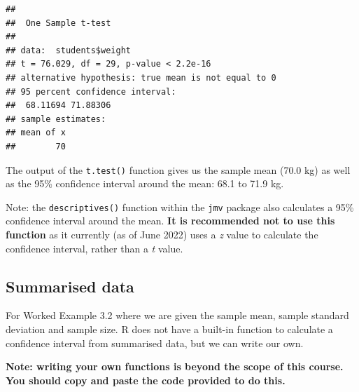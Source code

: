 \documentclass[
]{memoir}
\begin{document}
\begin{verbatim}
## 
##  One Sample t-test
## 
## data:  students$weight
## t = 76.029, df = 29, p-value < 2.2e-16
## alternative hypothesis: true mean is not equal to 0
## 95 percent confidence interval:
##  68.11694 71.88306
## sample estimates:
## mean of x 
##        70
\end{verbatim}

The output of the \texttt{t.test()} function gives us the sample mean (70.0 kg) as well as the 95\% confidence interval around the mean: 68.1 to 71.9 kg.

Note: the \texttt{descriptives()} function within the \texttt{jmv} package also calculates a 95\% confidence interval around the mean. \textbf{It is recommended not to use this function} as it currently (as of June 2022) uses a \emph{z} value to calculate the confidence interval, rather than a \emph{t} value.

\hypertarget{summarised-data}{%
\subsection{Summarised data}\label{summarised-data}}

For Worked Example 3.2 where we are given the sample mean, sample standard deviation and sample size. R does not have a built-in function to calculate a confidence interval from summarised data, but we can write our own.

\textbf{Note: writing your own functions is beyond the scope of this course. You should copy and paste the code provided to do this.}
\end{document}

